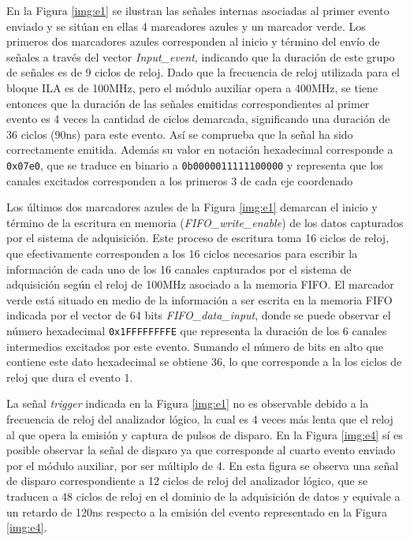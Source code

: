 	En la Figura \ref{img:e1} se ilustran las señales internas asociadas al primer evento enviado y se sitúan en ellas 4 marcadores azules y un marcador verde. Los primeros dos marcadores azules corresponden al inicio y término del envío de señales a través del vector \textit{Input\_event}, indicando que la duración de este grupo de señales es de 9 ciclos de reloj. Dado que la frecuencia de reloj utilizada para el bloque ILA es de 100MHz, pero el módulo auxiliar opera a 400MHz, se tiene entonces que la duración de las señales emitidas correspondientes al primer evento es 4 veces la cantidad de ciclos demarcada, significando una duración de 36 ciclos (90ns) para este evento. Así se comprueba que la señal ha sido correctamente emitida. Además su valor en notación hexadecimal corresponde a \texttt{0x07e0}, que se traduce en binario a \texttt{0b0000011111100000} y representa que los canales excitados corresponden a los primeros 3 de cada eje coordenado   
	
	Los últimos dos marcadores azules de la Figura \ref{img:e1} demarcan el inicio y término de la escritura en memoria (\textit{FIFO\_write\_enable}) de los datos capturados por el sistema de adquisición. Este proceso de escritura toma 16 ciclos de reloj, que efectivamente corresponden a los 16 ciclos necesarios para escribir la información de cada uno de los 16 canales capturados por el sistema de adquisición según el reloj de 100MHz asociado a la memoria FIFO. El marcador verde está situado en medio de la información a ser escrita en la memoria FIFO indicada por el vector de 64 bits \textit{FIFO\_data\_input}, donde se puede observar el número hexadecimal \texttt{0x1FFFFFFFFE} que representa la duración de los 6 canales intermedios excitados por este evento. Sumando el número de bits en alto que contiene este dato hexadecimal se obtiene 36, lo que corresponde a la los ciclos de reloj que dura el evento 1.
	
	La señal \textit{trigger} indicada en la Figura \ref{img:e1} no es observable debido a la frecuencia de reloj del analizador lógico, la cual es 4 veces más lenta que el reloj al que opera la emisión y captura de pulsos de disparo. En la Figura \ref{img:e4} sí es posible observar la señal de disparo ya que corresponde al cuarto evento enviado por el módulo auxiliar, por ser múltiplo de 4. En esta figura  se observa una señal de disparo correspondiente a 12 ciclos de reloj del analizador lógico, que se traducen a 48 ciclos de reloj en el dominio de la adquisición de datos y equivale a un retardo de 120ns respecto a la emisión del evento representado en la Figura \ref{img:e4}.
	
